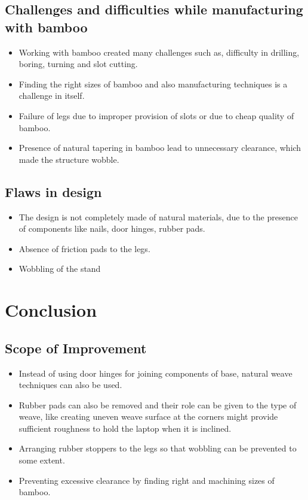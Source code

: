 \section{Challenges and difficulties while manufacturing with bamboo}

\begin{itemize}
	\item Working with bamboo created many challenges such as, difficulty in drilling, boring, 		turning and slot cutting. 
	\item Finding the right sizes of bamboo and also manufacturing techniques is a challenge in 	itself. 
	\item Failure of legs due to improper provision of slots or due to cheap quality of bamboo.
	\item Presence of natural tapering in bamboo lead to unnecessary clearance, which made the 	structure wobble.

\end{itemize}

\section{Flaws in design}

\begin{itemize}
\item The design is not completely made of natural materials, due to the presence of components like nails, door hinges, rubber pads. 
\item Absence of friction pads to the legs.
\item Wobbling of the stand

\end{itemize}

\chapter{Conclusion}

\section{Scope of Improvement}

\begin{itemize}
\item Instead of using door hinges for joining components of base, natural weave techniques can also be used.
\item Rubber pads can also be removed and their role can be given to the type of weave, like creating uneven weave surface at the corners might provide sufficient roughness to hold the laptop when it is inclined.
\item Arranging rubber stoppers to the legs so that wobbling can be prevented to some extent.
\item Preventing excessive clearance by finding right and machining sizes of bamboo.
\end{itemize}

